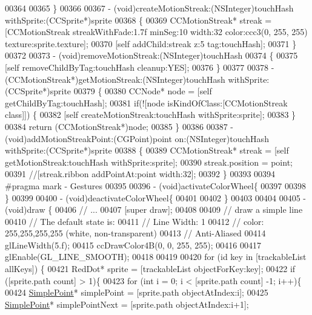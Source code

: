 \begin{DoxyCode}
{{{{{{{{{{{{00364     
00365 \}
00366 
00367 - (void)createMotionStreak:(NSInteger)touchHash withSprite:(CCSprite*)sprite
00368 \{
00369     CCMotionStreak* streak = [CCMotionStreak streakWithFade:1.7f minSeg:10 width:32 color:ccc3(0, 255, 255)
       texture:sprite.texture];
00370     [\textcolor{keyword}{self} addChild:streak z:5 tag:touchHash];
00371 \}
00372 
00373 - (void)removeMotionStreak:(NSInteger)touchHash
00374 \{
00375     [\textcolor{keyword}{self} removeChildByTag:touchHash cleanup:YES];
00376 \}
00377 
00378 - (CCMotionStreak*)getMotionStreak:(NSInteger)touchHash withSprite:(CCSprite*)sprite
00379 \{
00380     CCNode* node = [\textcolor{keyword}{self} getChildByTag:touchHash];
00381     \textcolor{keywordflow}{if}(![node isKindOfClass:[CCMotionStreak \textcolor{keyword}{class}]]) \{
00382         [\textcolor{keyword}{self} createMotionStreak:touchHash withSprite:sprite];
00383     \}
00384     \textcolor{keywordflow}{return} (CCMotionStreak*)node;
00385 \}
00386 
00387 - (void)addMotionStreakPoint:(CGPoint)point on:(NSInteger)touchHash withSprite:(CCSprite*)sprite
00388 \{
00389     CCMotionStreak* streak = [\textcolor{keyword}{self} getMotionStreak:touchHash withSprite:sprite];
00390     streak.position = point;
00391     \textcolor{comment}{//[streak.ribbon addPointAt:point width:32];}
00392 \}
00393 
00394 \textcolor{preprocessor}{#pragma mark - Gestures}
00395 \textcolor{preprocessor}{}
00396 - (void)activateColorWheel\{
00397     
00398 \}
00399 
00400 - (void)deactivateColorWheel\{
00401     
00402 \}
00403 
00404 
00405 - (void)draw \{
00406     \textcolor{comment}{// ...}
00407     [\textcolor{keyword}{super} draw];
00408 
00409     \textcolor{comment}{// draw a simple line}
00410     \textcolor{comment}{// The default state is:}
00411     \textcolor{comment}{// Line Width: 1}
00412     \textcolor{comment}{// color: 255,255,255,255 (white, non-transparent)}
00413     \textcolor{comment}{// Anti-Aliased}
00414     glLineWidth(5.f);
00415     ccDrawColor4B(0, 0, 255, 255);
00416     
00417     glEnable(GL\_LINE\_SMOOTH);
00418     
00419 
00420     \textcolor{keywordflow}{for} (\textcolor{keywordtype}{id} key in [trackableList allKeys]) \{
00421         RedDot* sprite = [trackableList objectForKey:key];
00422         \textcolor{keywordflow}{if} ([sprite.path count] > 1)\{
00423             \textcolor{keywordflow}{for} (\textcolor{keywordtype}{int} i = 0;  i < [sprite.path count] -1; i++)\{
00424                 \hyperlink{interface_simple_point}{SimplePoint}* simplePoint =  [sprite.path objectAtIndex:i];
00425                 \hyperlink{interface_simple_point}{SimplePoint}* simplePointNext = [sprite.path objectAtIndex:i+1];
}}}}}}}}}}}}
\end{DoxyCode}
